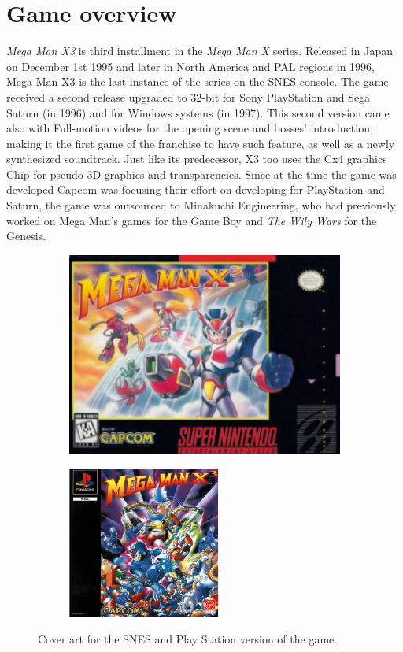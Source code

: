 \chapter{Game overview}
\textit{Mega Man X3} is third installment in the \textit{Mega Man X} series. Released in Japan on December 1st 1995 and later in North America and PAL regions in 1996, Mega Man X3 is the last instance of the series on the SNES console. The game received a second release upgraded to 32-bit for Sony PlayStation and Sega Saturn (in 1996) and for Windows systems (in 1997). This second version came also with Full-motion videos for the opening scene and bosses' introduction, making it the first game of the franchise to have such feature, as well as a newly synthesized soundtrack. Just like its predecessor, X3 too uses the Cx4 graphics Chip for pseudo-3D graphics and transparencies. Since at the time the game was developed Capcom was focusing their effort on developing for PlayStation and Saturn, the game was outsourced to Minakuchi Engineering, who had previously worked on Mega Man's games for the Game Boy and \textit{The Wily Wars} for the Genesis.

\begin{figure}[htp]
	\centering
	\begin{subfigure}[c]{0.45\linewidth}
		\centering
		\includegraphics[width=\linewidth]{figures/X3/Mmx3_box.jpg}
	\end{subfigure}
	\begin{subfigure}[c]{0.45\linewidth}
		\centering
		\includegraphics[height=5cm]{figures/X3/X3_ps.jpg}
	\end{subfigure}
	\caption{Cover art for the SNES and Play Station version of the game.}
\end{figure}

